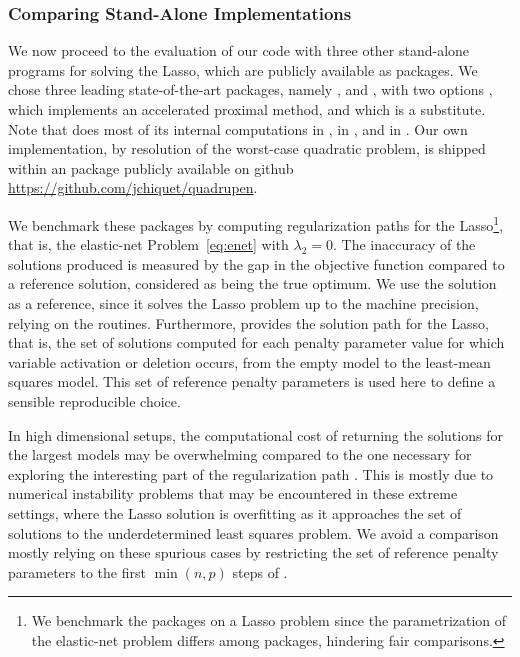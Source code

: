 \subsubsection{Comparing Stand-Alone Implementations}

We now proceed to the evaluation of our code with three other
stand-alone programs for solving the Lasso, which are publicly available as  packages.  We
chose three leading state-of-the-art packages, namely
 \citep[Generalized Linear Models regularized by
Lasso and elastic-net,][]{2009_JSS_Friedman}, 
\citep[Least Angle Regression, Lasso and Forward
Stagewise,][]{2004_AS_Efron} and  \citep[SPArse
Modeling Software,][]{2012_FML_Bach}, with two options
, which implements an accelerated proximal
method, and  which is a 
substitute.  Note that  does most of its internal
computations in ,  in ,
and  in .  Our own implementation, by
resolution of the worst-case quadratic problem, is shipped within an
 package  publicly available on github
{\url{https://github.com/jchiquet/quadrupen}}.

We benchmark these packages by computing  regularization paths for the
Lasso\footnote{%
  We benchmark the packages on a Lasso problem since the parametrization of the
  elastic-net problem differs among packages, hindering fair comparisons.},
that is, the elastic-net Problem~\eqref{eq:enet} with $\lambda_2=0$.   
%
The inaccuracy of the solutions produced is measured by the gap in the objective
function compared to a reference solution, considered as being the true optimum.  
\iflong
  We use the  solution as a reference, since it solves the Lasso problem
  up to the machine precision, relying on the  routines. 
  Furthermore,  provides the solution path for the Lasso,
  that is, the set of solutions computed for each penalty parameter value
  for which variable activation or deletion occurs, from the empty model to the
  least-mean squares model.
  This set of reference penalty parameters is used here to define a sensible reproducible choice.

  In high dimensional setups, the computational cost of returning the solutions
  for the largest models may be overwhelming compared to the one necessary
  for exploring the interesting part of the regularization path
  \citep{2011_JSS_Simon,2009_JSS_Friedman}.  This is mostly due to numerical
  instability problems that may be encountered in these extreme settings, where
  the Lasso solution is overfitting as it approaches the set of solutions to the
  underdetermined least squares problem.  We avoid a
  comparison mostly relying on these spurious cases by restricting the set
  of reference penalty parameters to the first $\min(n,p)$ steps of
   \citep[similar settings are used by][]{2009_JSS_Friedman}.

